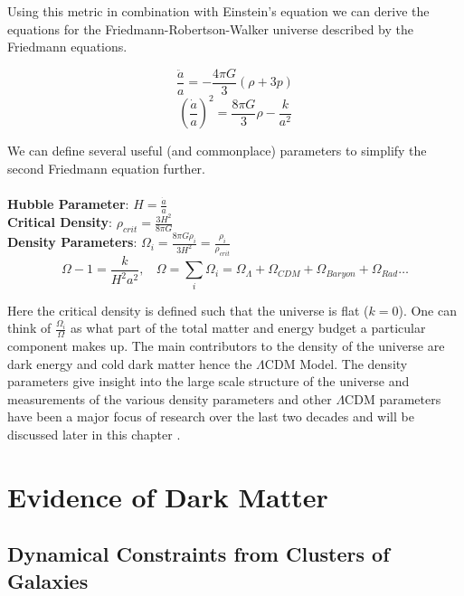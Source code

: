 	Using this metric in combination with Einstein's equation we can derive the equations for the Friedmann-Robertson-Walker universe described by the Friedmann equations.
	
	\begin{equation}
		\frac{\ddot{a}}{a} = -\frac{4 \pi G}{3} \left( \rho + 3p \right)
	\end{equation}
	\begin{equation}
		\left( \frac{\dot{a}}{a}\right)^{2} = \frac{8 \pi G}{3} \rho - \frac{k}{a^2}
	\end{equation}

	We can define several useful (and commonplace) parameters to simplify the second Friedmann equation further.
\\
\\
\textbf{Hubble Parameter}: $ H = \frac{\dot{a}}{a} $\\
\textbf{Critical Density}: $ \rho_{crit} = \frac{3H^2}{8 \pi G} $\\
\textbf{Density Parameters}: $ \Omega_{i} = \frac{8 \pi G \rho_i}{3H^2} = \frac{\rho_{i}}{\rho_{crit}} $\\
\begin{equation}
	\Omega - 1 = \frac{k}{H^2 a^2}, \ \ \ \ \Omega = \sum_{i} \Omega_{i} = \Omega_{\Lambda} + \Omega_{CDM} + \Omega_{Baryon} + \Omega_{Rad}  \ldots 
\end{equation}
	
Here the critical density is defined such that the universe is flat ($k=0$).  One can think of $\frac{\Omega_i}{\Omega}$ as what part of the total matter and energy budget a particular component makes up.  The main contributors to the density of the universe are dark energy and cold dark matter hence the $\Lambda$CDM Model.  The density parameters give insight into the large scale structure of the universe and measurements of the various density parameters and other $\Lambda$CDM parameters have been a major focus of research over the last two decades and will be discussed later in this chapter \cite{carroll1997lecture}.
	
\section{Evidence of Dark Matter}

\subsection{Dynamical Constraints from Clusters of Galaxies}

